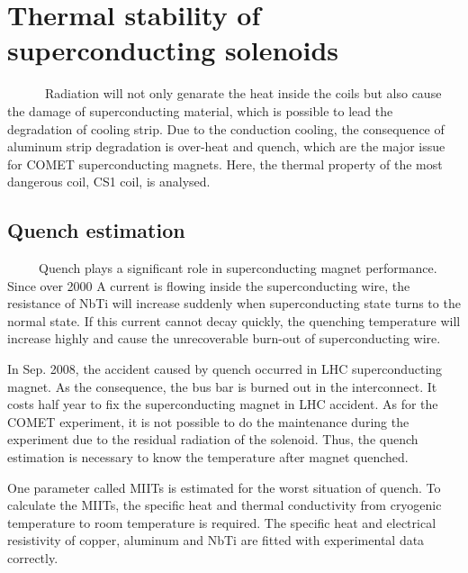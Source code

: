 \chapter{Thermal stability of superconducting solenoids}
~~~~~~Radiation will not only genarate the heat inside the coils but also cause the damage of superconducting material, which is possible to lead the degradation of cooling strip.
Due to the conduction cooling, the consequence of aluminum strip degradation is over-heat and quench, which are the major issue for COMET superconducting magnets.
Here, the thermal property of the most dangerous coil, CS1 coil, is analysed.

\section{Quench estimation}
~~~~~Quench plays a significant role in superconducting magnet performance.
Since over 2000 A current is flowing inside the superconducting wire, the resistance of NbTi will increase suddenly when superconducting state turns to the normal state.
If this current cannot decay quickly, the quenching temperature will increase highly and cause the unrecoverable burn-out of superconducting wire.

In Sep. 2008, the accident caused by quench occurred in LHC superconducting magnet.
As the consequence, the bus bar is burned out in the interconnect.
It costs half year to fix the superconducting magnet in LHC accident.
As for the COMET experiment, it is not possible to do the maintenance during the experiment due to the residual radiation of the solenoid.
Thus, the quench estimation is necessary to know the temperature after magnet quenched.

One parameter called MIITs is estimated for the worst situation of quench.
To calculate the MIITs, the specific heat and thermal conductivity from cryogenic temperature to room temperature is required.
The specific heat and electrical resistivity of copper, aluminum and NbTi are fitted with experimental data correctly.


